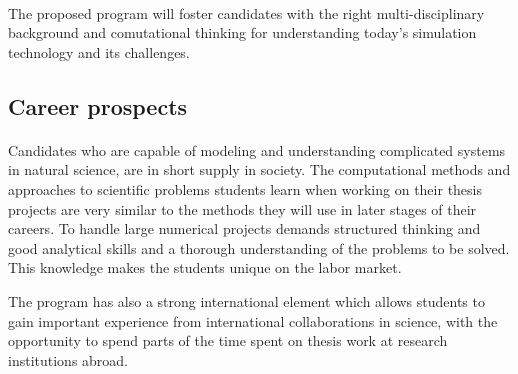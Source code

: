 \documentclass[%
oneside,                 %
final,                   %
10pt]{article}
\begin{document}
\paragraph{}
The proposed program will foster candidates with the right
multi-disciplinary background and comutational thinking for
understanding today's simulation technology and its challenges.






\subsection*{Career prospects}


\paragraph{}
Candidates who are capable of modeling and understanding complicated
systems in natural science, are in short supply in society.  The
computational methods and approaches to scientific problems students learn
when working on their thesis projects are very similar to the methods
they will use in later stages of their careers.  To handle large
numerical projects demands structured thinking and good analytical
skills and a thorough understanding of the problems to be solved. This
knowledge makes the students unique on the labor market.


The program has also a strong international element which allows students to
gain important experience from international collaborations in
science, with the opportunity to spend parts of the time spent on 
thesis work at research institutions abroad.







\printindex
\end{document}
